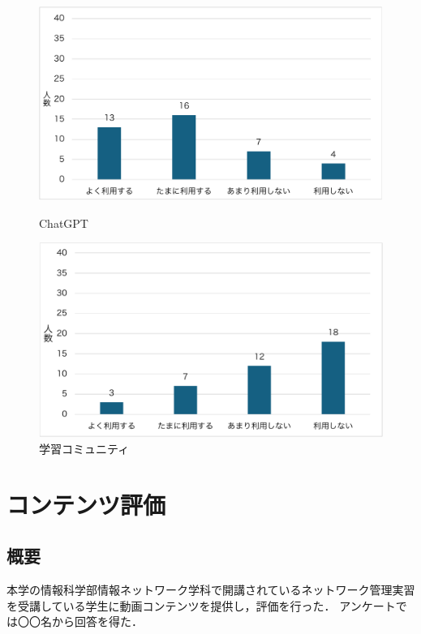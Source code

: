 \documentclass[12pt,a4j,titlepage]{ltjsarticle}
\begin{document}
\begin{figure}[!htb]
\centering
\begin{minipage}[b]{0.49\columnwidth}
    \centering
    \includegraphics[width=1.0\columnwidth]{ChatGPT.pdf}
    \caption{ChatGPT}
    \label{fig:ChatGPT2}
\end{minipage}
\begin{minipage}[b]{0.49\columnwidth}
    \centering
    \includegraphics[width=1.0\columnwidth]{学習コミュニティ.pdf}
    \caption{学習コミュニティ}
    \label{fig:community}
\end{minipage}
\end{figure}

\clearpage


\section{コンテンツ評価}
\subsection{概要}
本学の情報科学部情報ネットワーク学科で開講されているネットワーク管理実習を受講している学生に動画コンテンツを提供し，評価を行った．
アンケートでは〇〇名から回答を得た．
\end{document}
